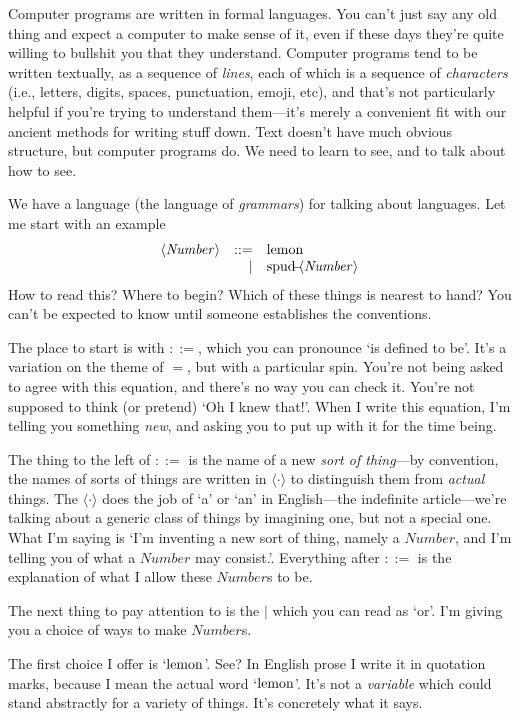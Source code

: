 \documentclass{book}
\begin{document}
Computer programs are written in formal languages. You can't just say any old thing and expect a computer to make sense of it, even if these days they're quite willing to bullshit you that they understand. Computer programs tend to be written textually, as a sequence of \emph{lines}, each of which is a sequence of \emph{characters} (i.e., letters, digits, spaces, punctuation, emoji, etc), and that's not particularly helpful if you're trying to understand them---it's merely a convenient fit with our ancient methods for writing stuff down. Text doesn't have much obvious structure, but computer programs do. We need to learn to see, and to talk about how to see.

We have a language (the language of \emph{grammars}) for talking about languages. Let me start with an example
\newcommand{\nt}[1]{\langle\mathit{#1}\rangle}
\[\begin{array}{rrl}
\nt{Number} & ::= & \lemon\\
            &   | & \spud\nt{Number}
\end{array}\]
How to read this? Where to begin? Which of these things is nearest to hand? You can't be expected to know until someone establishes the conventions.

The place to start is with $::=$, which you can pronounce `is defined to be'. It's a variation on the theme of $=$, but with a particular spin. You're not being asked to agree with this equation, and there's no way you can check it. You're not supposed to think (or pretend) `Oh I knew that!'. When I write this equation, I'm telling you something \emph{new}, and asking you to put up with it for the time being.

The thing to the left of $::=$ is the name of a new \emph{sort of thing}---by convention, the names of sorts of things are written in $\nt{\cdot}$ to distinguish them from \emph{actual} things. The $\nt{\cdot}$ does the job of `a' or `an' in English---the indefinite article---we're talking about a generic class of things by imagining one, but not a special one. What I'm saying is `I'm inventing a new sort of thing, namely a $\mathit{Number}$, and I'm telling you of what a $\mathit{Number}$ may consist.'. Everything after $::=$ is the explanation of what I allow these $\mathit{Number}$s to be.

The next thing to pay attention to is the $|$ which you can read as `or'. I'm giving you a choice of ways to make $\mathit{Number}$s.

The first choice I offer is `$\mbox{lemon}$'. See? In English prose I write it in quotation marks, because I mean the actual word `$\mbox{lemon}$'. It's not a \emph{variable} which could stand abstractly for a variety of things. It's concretely what it says.
\end{document}
